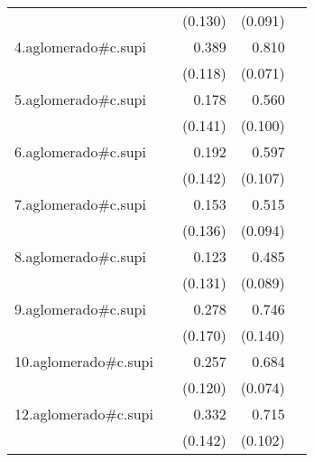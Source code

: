{\begin{longtable}{l*{4}{D{.}{.}{-1}}}
            &                     &     (0.130)         &     (0.091)         &                     \\
\addlinespace
4.aglomerado#c.supi&                     &       0.389\sym{***}&       0.810\sym{***}&                     \\
            &                     &     (0.118)         &     (0.071)         &                     \\
\addlinespace
5.aglomerado#c.supi&                     &       0.178         &       0.560\sym{***}&                     \\
            &                     &     (0.141)         &     (0.100)         &                     \\
\addlinespace
6.aglomerado#c.supi&                     &       0.192         &       0.597\sym{***}&                     \\
            &                     &     (0.142)         &     (0.107)         &                     \\
\addlinespace
7.aglomerado#c.supi&                     &       0.153         &       0.515\sym{***}&                     \\
            &                     &     (0.136)         &     (0.094)         &                     \\
\addlinespace
8.aglomerado#c.supi&                     &       0.123         &       0.485\sym{***}&                     \\
            &                     &     (0.131)         &     (0.089)         &                     \\
\addlinespace
9.aglomerado#c.supi&                     &       0.278         &       0.746\sym{***}&                     \\
            &                     &     (0.170)         &     (0.140)         &                     \\
\addlinespace
10.aglomerado#c.supi&                     &       0.257\sym{*}  &       0.684\sym{***}&                     \\
            &                     &     (0.120)         &     (0.074)         &                     \\
\addlinespace
12.aglomerado#c.supi&                     &       0.332\sym{*}  &       0.715\sym{***}&                     \\
            &                     &     (0.142)         &     (0.102)         &                     \\

\end{longtable}}
